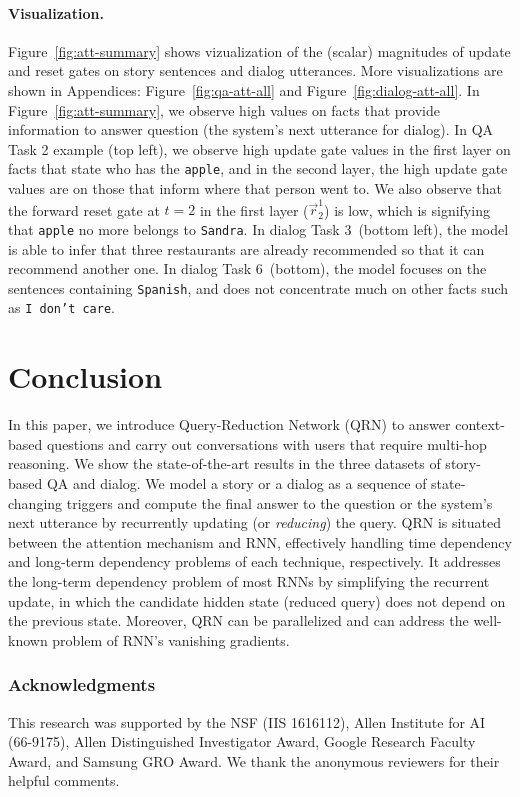 \documentclass[table]{article}
\begin{document}
\paragraph{Visualization.}
Figure~\ref{fig:att-summary} shows vizualization of the (scalar) magnitudes of update and reset gates on story sentences and dialog utterances.
More visualizations are shown in Appendices: Figure~\ref{fig:qa-att-all} and Figure~\ref{fig:dialog-att-all}.
In Figure~\ref{fig:att-summary}, we observe high values on facts that provide information to answer question (the system's next utterance for dialog).
In QA Task 2 example (top left), we observe high update gate values  in the first layer on facts that state who has the \texttt{apple}, and in the second layer, the high update gate values are on those that inform where that person went to. We also observe that the forward reset gate at $t=2$ in the first layer ($\overrightarrow{r}^1_2$) is low, which is signifying that \texttt{apple} no more belongs to \texttt{Sandra}. In dialog Task 3~(bottom left), the model is able to infer that three restaurants are already recommended so that it can recommend another one. In dialog Task 6~(bottom), the model focuses on the sentences containing \texttt{Spanish}, and does not concentrate much on other facts such as \texttt{I don't care}.
 


\section{Conclusion} 
\vspace{-.3cm}
In this paper, we introduce Query-Reduction Network (QRN)  to answer context-based questions and carry out conversations with users that require multi-hop reasoning. 
We show the state-of-the-art results in the three datasets of story-based QA and dialog. 
We model a story or a dialog as a sequence of state-changing triggers and compute the final answer to the question or the system's next utterance by recurrently updating (or \emph{reducing}) the query.
QRN is situated between the attention mechanism and RNN, effectively handling time dependency and long-term dependency problems of each technique, respectively.  It addresses the long-term dependency problem of most RNNs by simplifying the recurrent update, in which the candidate hidden state (reduced query) does not depend on the previous state. Moreover, QRN can be parallelized and can address the well-known problem of RNN's vanishing gradients.
\subsubsection*{Acknowledgments}
This research was supported by the NSF (IIS 1616112), Allen Institute for AI (66-9175), Allen Distinguished Investigator Award, Google Research Faculty Award, and Samsung GRO Award. We thank the anonymous reviewers for their helpful comments.
\end{document}
